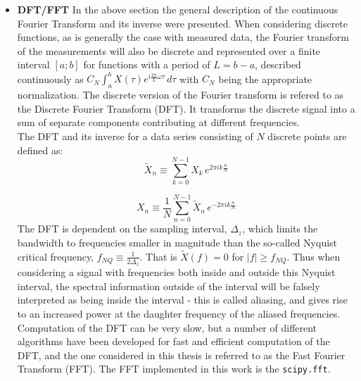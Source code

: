 \documentclass[../../CompleteThesis2/Complete_2ndDraft]{subfiles}
\begin{document}
\begin{itemize}
	\item \textbf{DFT/FFT} In the above section the general description of the continuous Fourier Transform and its inverse were presented. When considering discrete functions, as is generally the case with measured data, the Fourier transform of the measurements will also be discrete and represented over a finite interval $[a;b]$ for functions with a period of $L=b-a$, described continuously as $C_N\int_{a}^{b}X(\tau)e^{i\frac{2\pi}{L}\omega\tau} \, d\tau$ with $C_N$ being the appropriate normalization. The discrete version of the Fourier transform is refered to as the Discrete Fourier Transform (DFT). It transforms the discrete signal into a sum of separate components contributing at different frequencies.\\
	The DFT and its inverse for a data series consisting of $N$ discrete points are defined as:
	\begin{equation}
		\tilde{X}_n\equiv \sum_{k=0}^{N-1}X_k \, e^{2\pi i k \frac{n}{N}}
	\end{equation}

	\begin{equation}
		X_n\equiv \frac{1}{N} \sum_{n=0}^{N-1}\tilde{X}_n \, e^{-2\pi i k \frac{n}{N}}
	\end{equation}
	The DFT is dependent on the sampling interval, $\Delta_z$, which limits the bandwidth to frequencies smaller in magnitude than the so-called Nyquist critical frequency, $f_{NQ}\equiv\frac{1}{2\Delta_z}$. That is $\tilde{X}(f)=0$ for $|f|\geq f_{NQ}$. Thus when considering a signal with frequencies both inside and outside this Nyquist interval, the spectral information outside of the interval will be falsely interpreted as being inside the interval - this is called aliasing, and gives rise to an increased power at the daughter frequency of the aliased frequencies.\\
	Computation of the DFT can be very slow, but a number of different algorithms have been developed for fast and efficient computation of the DFT, and the one considered in this thesis is referred to as the Fast Fourier Transform (FFT). The FFT implemented in this work is the \lstinline[language=python]|scipy.fft|.	
	

\end{itemize}
\end{document}
